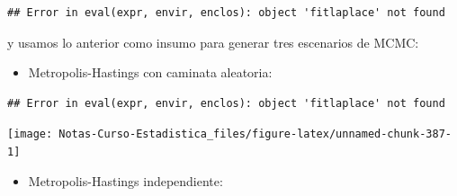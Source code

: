 \documentclass[
  12pt,
]{book}
\newenvironment{Shaded}{\begin{snugshade}}{\end{snugshade}}
\newcommand{\AttributeTok}[1]{\textcolor[rgb]{0.77,0.63,0.00}{#1}}
\newcommand{\DecValTok}[1]{\textcolor[rgb]{0.00,0.00,0.81}{#1}}
\newcommand{\FloatTok}[1]{\textcolor[rgb]{0.00,0.00,0.81}{#1}}
\newcommand{\FunctionTok}[1]{\textcolor[rgb]{0.00,0.00,0.00}{#1}}
\newcommand{\NormalTok}[1]{#1}
\newcommand{\OtherTok}[1]{\textcolor[rgb]{0.56,0.35,0.01}{#1}}
\newcommand{\SpecialCharTok}[1]{\textcolor[rgb]{0.00,0.00,0.00}{#1}}
\newcommand{\StringTok}[1]{\textcolor[rgb]{0.31,0.60,0.02}{#1}}
\providecommand{\tightlist}{%
  \setlength{\itemsep}{0pt}\setlength{\parskip}{0pt}}
\theoremstyle{definition}
\theoremstyle{definition}
\theoremstyle{definition}
\theoremstyle{definition}
\theoremstyle{remark}
\begin{document}
\begin{verbatim}
## Error in eval(expr, envir, enclos): object 'fitlaplace' not found
\end{verbatim}

y usamos lo anterior como insumo para generar tres escenarios de MCMC:

\begin{itemize}
\tightlist
\item
  Metropolis-Hastings con caminata aleatoria:
\end{itemize}

\begin{Shaded}
\end{Shaded}

\begin{verbatim}
## Error in eval(expr, envir, enclos): object 'fitlaplace' not found
\end{verbatim}

\begin{Shaded}
\end{Shaded}

\begin{center}\texttt{[image: Notas-Curso-Estadistica\_files/figure-latex/unnamed-chunk-387-1]} \end{center}

\begin{itemize}
\tightlist
\item
  Metropolis-Hastings independiente:
\end{itemize}
\end{document}

